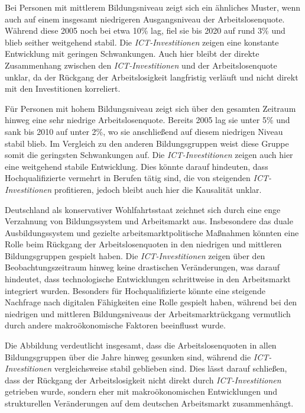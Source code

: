 Bei Personen mit mittlerem Bildungsniveau zeigt sich ein ähnliches Muster, wenn auch 
auf einem insgesamt niedrigeren Ausgangsniveau der Arbeitslosenquote. Während diese 
2005 noch bei etwa 10\% lag, fiel sie bis 2020 auf rund 3\% und blieb seither 
weitgehend stabil. Die \textit{\ac{ICT}-Investitionen} zeigen eine konstante 
Entwicklung mit geringen Schwankungen. Auch hier bleibt der direkte Zusammenhang 
zwischen den \textit{\ac{ICT}-Investitionen} und der Arbeitslosenquote unklar, da 
der Rückgang der Arbeitslosigkeit langfristig verläuft und nicht direkt mit den 
Investitionen korreliert.

Für Personen mit hohem Bildungsniveau zeigt sich über den gesamten Zeitraum hinweg 
eine sehr niedrige Arbeitslosenquote. Bereits 2005 lag sie unter 5\% und sank bis
2010 auf unter 2\%, wo sie anschließend auf diesem niedrigen Niveau stabil blieb. 
Im Vergleich zu den anderen Bildungsgruppen weist diese Gruppe somit die geringsten 
Schwankungen auf. Die \textit{\ac{ICT}-Investitionen} zeigen auch hier eine 
weitgehend stabile Entwicklung. Dies könnte darauf hindeuten, dass Hochqualifizierte 
vermehrt in Berufen tätig sind, die von steigenden \textit{\ac{ICT}-Investitionen} 
profitieren, jedoch bleibt auch hier die Kausalität unklar.

Deutschland als konservativer Wohlfahrtsstaat zeichnet sich durch eine enge Verzahnung 
von Bildungssystem und Arbeitsmarkt aus. Insbesondere das duale Ausbildungssystem 
und gezielte arbeitsmarktpolitische Maßnahmen könnten eine Rolle beim Rückgang der 
Arbeitslosenquoten in den niedrigen und mittleren Bildungsgruppen gespielt haben. 
Die \textit{\ac{ICT}-Investitionen} zeigen über den Beobachtungszeitraum hinweg keine 
drastischen Veränderungen, was darauf hindeutet, dass technologische Entwicklungen 
schrittweise in den Arbeitsmarkt integriert wurden. Besonders für Hochqualifizierte 
könnte eine steigende Nachfrage nach digitalen Fähigkeiten eine Rolle gespielt 
haben, während bei den niedrigen und mittleren Bildungsniveaus der 
Arbeitsmarktrückgang vermutlich durch andere makroökonomische Faktoren beeinflusst 
wurde. %

Die Abbildung verdeutlicht insgesamt, dass die Arbeitslosenquoten in allen 
Bildungsgruppen über die Jahre hinweg gesunken sind, während die 
\textit{\ac{ICT}-Investitionen} vergleichsweise stabil geblieben sind. Dies lässt darauf 
schließen, dass der Rückgang der Arbeitslosigkeit nicht direkt durch 
\textit{\ac{ICT}-Investitionen} getrieben wurde, sondern eher mit makroökonomischen 
Entwicklungen und strukturellen Veränderungen auf dem deutschen Arbeitsmarkt 
zusammenhängt.

